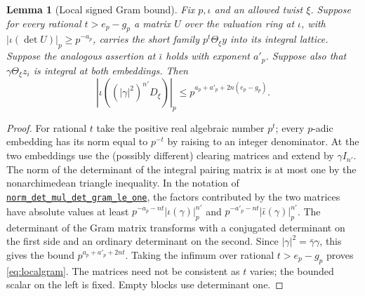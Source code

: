 \documentclass[11pt,letterpaper]{article}
\newtheorem{lemma}[theorem]{Lemma}
\theoremstyle{remark}\newtheorem{remark}[theorem]{Remark}
\newcommand{\src}[3]{\href{https://github.com/VladimirReshetnikov/ProveIt/blob/89d12dd40424f1217fd818d84877b3da52396a3b/Analysis/GeneralizedRiemannHypothesis/Lean/grh/src/#1.lean\#L#2}{\texttt{#3}}}
\begin{document}
\begin{lemma}[Local signed Gram bound]\label{lem:local}
Fix $p,\iota$ and an allowed twist $\xi$. Suppose for every rational $t>e_p-g_p$ a matrix $U$ over the valuation ring at $\iota$, with $|\iota(\det U)|_p\ge p^{-a_p}$, carries the short family $p^t\Theta_\xi y$ into its integral lattice. Suppose the analogous assertion at $\bar\iota$ holds with exponent $a'_p$. Suppose also that $\gamma\Theta_\xi z_i$ is integral at both embeddings. Then
\begin{equation}\label{eq:localgram}
 \left|\iota\left((|\gamma|^2)^{n'}D_\xi\right)\right|_p
 \le p^{a_p+a'_p+2n(e_p-g_p)}.
\end{equation}
\end{lemma}
\begin{proof}
For rational $t$ take the positive real algebraic number $p^t$; every $p$-adic embedding has its norm equal to $p^{-t}$ by raising to an integer denominator. At the two embeddings use the (possibly different) clearing matrices and extend by $\gamma I_{n'}$. The norm of the determinant of the integral pairing matrix is at most one by the nonarchimedean triangle inequality. In the notation of \src{New/Reduction/Lattices/TwistedLattice}{375}{norm\_det\_mul\_det\_gram\_le\_one}, the factors contributed by the two matrices have absolute values at least $p^{-a_p-nt}|\iota(\gamma)|_p^{n'}$ and $p^{-a'_p-nt}|\bar\iota(\gamma)|_p^{n'}$. The determinant of the Gram matrix transforms with a conjugated determinant on the first side and an ordinary determinant on the second. Since $|\gamma|^2=\bar\gamma\gamma$, this gives the bound $p^{a_p+a'_p+2nt}$. Taking the infimum over rational $t>e_p-g_p$ proves \eqref{eq:localgram}. The matrices need not be consistent as $t$ varies; the bounded scalar on the left is fixed. Empty blocks use determinant one.
\end{proof}
\end{document}
